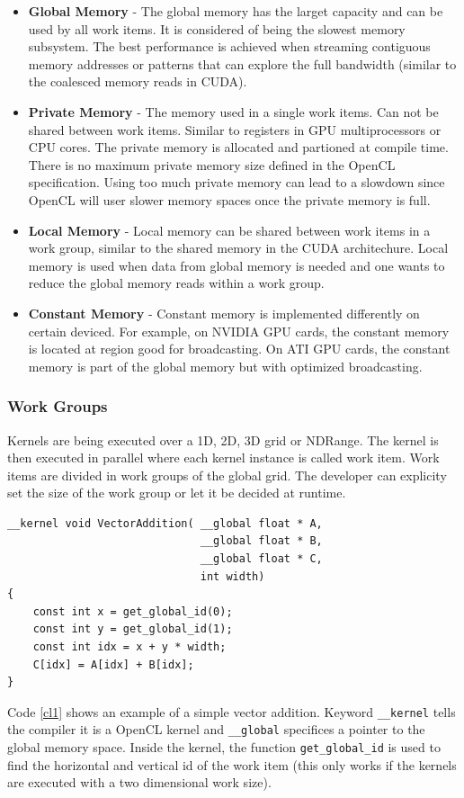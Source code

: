 \begin{itemize}
\item{{\bf Global Memory} - The global memory has the larget capacity and can be used by all work items. It is considered of being the slowest memory subsystem. The best performance is achieved when streaming contiguous memory addresses or patterns that can explore the full bandwidth (similar to the coalesced memory reads in CUDA). }
\item{{\bf Private Memory} - The memory used in a single work items. Can not be shared between work items. Similar to registers in GPU multiprocessors or CPU cores. The private memory is allocated and partioned at compile time. There is no maximum private memory size defined  in the OpenCL specification. Using too much private memory can lead to a slowdown since OpenCL will user slower memory spaces once the private memory is full.}
\item{{\bf Local Memory} - Local memory can be shared between work items in a work group, similar to the shared memory in the CUDA architechure. Local memory is used when data from global memory is needed and one wants to reduce the global memory reads within a work group.}
\item{{\bf Constant Memory} - Constant memory is implemented differently on certain deviced. For example, on NVIDIA GPU cards, the constant memory is located at region good for broadcasting. On ATI GPU cards, the constant memory is part of the global memory but with optimized broadcasting.}
\end{itemize}

\subsubsection{Work Groups}

Kernels are being executed over a 1D, 2D, 3D grid or NDRange. The kernel is then executed in parallel where each kernel instance is called work item. Work items are divided in work groups of the global grid. The developer can explicity set the size of the work group or let it be decided at runtime.

\renewcommand{\lstlistingname}{Code}
\begin{lstlisting}[caption= Example of vector addition in OpenCL, label=cl1]
__kernel void VectorAddition( __global float * A,
                              __global float * B,
                              __global float * C,
                              int width)
{ 
    const int x = get_global_id(0); 
    const int y = get_global_id(1); 
    const int idx = x + y * width;
    C[idx] = A[idx] + B[idx];
}
\end{lstlisting}

Code \ref{cl1} shows an example of a simple vector addition. Keyword \texttt{\_\_kernel} tells the compiler it is a OpenCL kernel and \texttt{\_\_global} specifices a pointer to the global memory space. Inside the kernel, the function \texttt{get\_global\_id} is used to find the horizontal and vertical id of the work item (this only works if the kernels are executed with a two dimensional work size).
